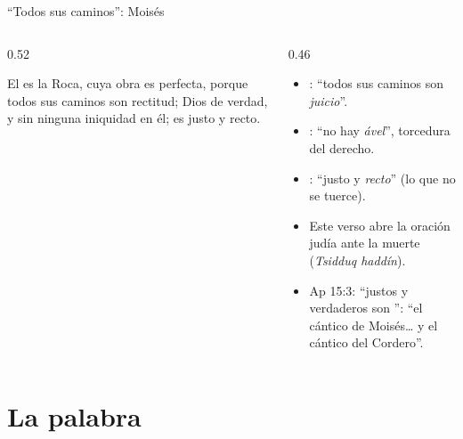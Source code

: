\begin{frame}{``Todos sus caminos'': Moisés}
\begin{columns}[c,onlytextwidth]
\begin{column}{0.52\textwidth}
\begin{cita}El es la Roca, cuya obra es perfecta, porque todos sus caminos son rectitud; Dios de verdad, y sin ninguna iniquidad en él; es justo y recto.\end{cita}
\begin{center}\small{}\\\end{center}
\end{column}
\begin{column}{0.46\textwidth}\scriptsize
\begin{itemize}
\item {}: ``todos sus caminos son \emph{juicio}''.
\item {}: ``no hay \emph{ável}'', torcedura del derecho.
\item {}: ``justo y \emph{recto}'' (lo que no se tuerce).
\item Este verso abre la oración judía ante la muerte (\emph{Tsidduq haddín}).
\item Ap 15:3: ``justos y verdaderos son '': ``el cántico de Moisés\ldots{} y el cántico del Cordero''.
\end{itemize}
\end{column}
\end{columns}
\end{frame}

\section{La palabra}

